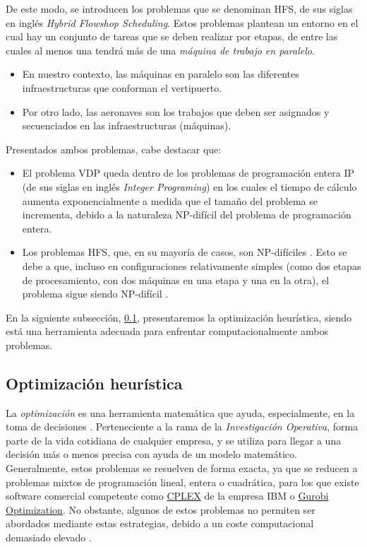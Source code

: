 \documentclass[12pt,a4paper]{book}
\begin{document}
De este modo, se introducen los problemas que se denominan HFS, de sus siglas en inglés \textsl{Hybrid Flowshop Scheduling}. Estos problemas plantean un entorno en el cual hay un conjunto de tareas que se deben realizar por etapas, de entre las cuales al menos una tendrá más de una \textsl{máquina de trabajo en paralelo}. 
\begin{itemize}
	\item En nuestro contexto, las máquinas en paralelo son las diferentes infraestructuras que conforman el vertipuerto. 
	\item Por otro lado, las aeronaves son los trabajos que deben ser asignados y secuenciados en las infraestructuras (máquinas). 
\end{itemize}

Presentados ambos problemas, cabe destacar que: 
\begin{itemize}
	\item El problema VDP queda dentro de los problemas de programación entera IP (de sus siglas en inglés \textsl{Integer Programing}) en los cuales el tiempo de cálculo aumenta exponencialmente a medida que el tamaño del problema se incrementa, debido a la naturaleza NP-difícil del problema de programación entera. 
	\item Los problemas HFS, que, en su mayoría de casos, son NP-difíciles \cite{espejo-diaz_heuristic_2023}. Esto se debe a que, incluso en configuraciones relativamente simples (como dos etapas de procesamiento, con dos máquinas en una etapa y una en la otra), el problema sigue siendo NP-difícil \cite{gupta_two-stage_1988}. 
\end{itemize}

En la siguiente subsección, \ref{Subsubsec: 1_2_4}, presentaremos la optimización heurística, siendo está una herramienta adecuada para enfrentar computacionalmente ambos problemas.

\subsection{Optimización heurística} \label{Subsubsec: 1_2_4}
La \textsl{optimización} es una herramienta matemática que ayuda, especialmente, en la toma de decisiones \cite{e_besada_optimizacion_nodate}. Perteneciente a la rama de la \textsl{Investigación Operativa}, forma parte de la vida cotidiana de cualquier empresa, y se utiliza para llegar a una decisión más o menos precisa con ayuda de un modelo matemático. Generalmente, estos problemas se resuelven de forma exacta, ya que se reducen a problemas mixtos de programación lineal, entera o cuadrática, para los que existe software comercial competente como \href{https://www.ibm.com/mx-es/products/ilog-cplex-optimization-studio/cplex-optimizer}{CPLEX} de la empresa IBM o \href{https://www.gurobi.com/}{Gurobi Optimization}. No obstante, algunos de estos problemas no permiten ser abordados mediante estas estrategias, debido a un coste computacional demasiado elevado \cite{e_besada_optimizacion_nodate, jorge_martinez_liebana_investigacion_2019}. 
\end{document}
